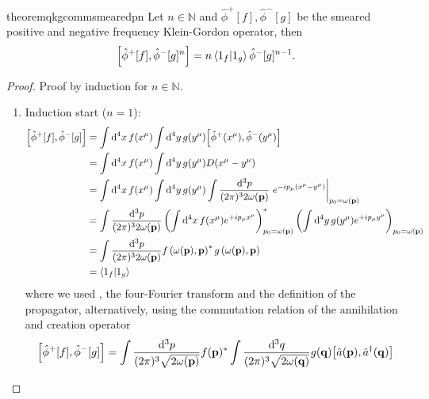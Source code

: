 \begin{restatable}{theorem}{qkgcommsmearedpn}\label{thm:qkg_comm_smeared_pn}
	Let $n\in\mathbb{N}$ and $\hat\phi^+[f],\hat\phi^-[g]$ be the smeared positive and negative frequency Klein-Gordon operator, then
	\begin{equation}
		\comm{\hat\phi^+[f]}{\hat\phi^-[g]^n}
		=
		n
		\braket{1_f}{1_g}
		\hat\phi^-[g]^{n-1}
		.
	\end{equation}
\end{restatable}
\begin{proof}
	Proof by induction for $n\in\mathbb{N}$.
	\begin{enumerate}
		\item Induction start ($n=1$):
		\begin{equation*}
			\begin{split}
				\comm{\hat\phi^+[f]}{\hat\phi^-[g]}
				&=
				\int\dd[4]{x}f(x^\mu)
				\int\dd[4]{y}g(y^\mu)
				\comm{\hat\phi^+(x^\mu)}{\hat\phi^-(y^\mu)}
				\\
				&=
				\int\dd[4]{x}f(x^\mu)
				\int\dd[4]{y}g(y^\mu)
				D(x^\mu-y^\mu)
				\\
				&=
				\int\dd[4]{x}f(x^\mu)
				\int\dd[4]{y}g(y^\mu)
				\int\frac{\dd[3]{p}}{(2\pi)^32\omega(\vb{p})}
				\eval{e^{-ip_\mu(x^\mu-y^\mu)}}_{p_0=\omega(\vb{p})}
				\\
				&=
				\int\frac{\dd[3]{p}}{(2\pi)^32\omega(\vb{p})}
				\left(
					\int\dd[4]{x}
					f(x^\mu)
					e^{+ip_\mu x^\mu}
				\right)^*_{p_0=\omega(\vb{p})}
				\left(
					\int\dd[4]{y}
					g(y^\mu)
					e^{+ip_\mu y^\mu}
				\right)_{p_0=\omega(\vb{p})}
				\\
				&=
				\int\frac{\dd[3]{p}}{(2\pi)^32\omega(\vb{p})}
				f\left(\omega(\vb{p}),\vb{p}\right)^*
				g\left(\omega(\vb{p}),\vb{p}\right)
				\\
				&=
				\braket{1_f}{1_g}
			\end{split}
		\end{equation*}
		where we used , the four-Fourier transform and the definition of the propagator, alternatively, using the commutation relation of the annihilation and creation operator
		\begin{equation*}
			\begin{split}
				\comm{\hat\phi^+[f]}{\hat\phi^-[g]}
				&=
				\int\frac{\dd[3]{p}}{(2\pi)^3\sqrt{2\omega(\vb{p})}}
				f(\vb{p})^*
				\int\frac{\dd[3]{q}}{(2\pi)^3\sqrt{2\omega(\vb{q})}}
				g(\vb{q})
				\comm{\hat{a}(\vb{p})}{\hat{a}^\dagger(\vb{q})}
				\\

\end{split}
\end{equation*}
\end{enumerate}
\end{proof}
